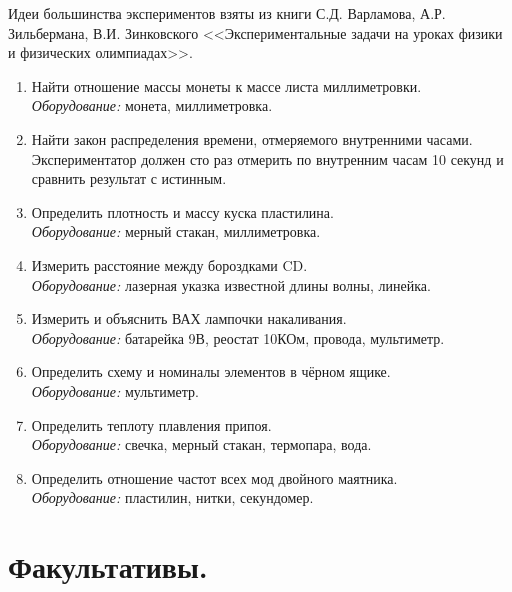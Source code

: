 \documentclass[11pt]{article}
\newlength{\h}
\newlength{\x}
\begin{document}
Идеи большинства экспериментов взяты из книги С.Д. Варламова,
А.Р. Зильбермана, В.И. Зинковского <<Экспериментальные задачи на
уроках физики и физических олимпиадах>>.

\begin{enumerate}
\item Найти отношение массы монеты к массе листа миллиметровки.\\
  \textit{Оборудование:} монета, миллиметровка.
\item Найти закон распределения времени, отмеряемого внутренними
  часами. Экспериментатор должен сто раз отмерить по внутренним часам
  10 секунд и сравнить результат с истинным.
\item Определить плотность и массу куска пластилина.\\
  \textit{Оборудование:} мерный стакан, миллиметровка.
\item Измерить расстояние между бороздками CD.\\
  \textit{Оборудование:} лазерная указка известной длины волны,
  линейка.
\item Измерить и объяснить ВАХ лампочки накаливания.\\
  \textit{Оборудование:} батарейка 9В, реостат 10КОм, провода, мультиметр. 
\item Определить схему и номиналы элементов в чёрном ящике.\\
  \textit{Оборудование:} мультиметр. 
\item Определить теплоту плавления припоя.\\
  \textit{Оборудование:} свечка, мерный стакан, термопара, вода. 
\item Определить отношение частот всех мод двойного
  маятника.\\
  \textit{Оборудование:} пластилин, нитки, секундомер.
\end{enumerate}

\section{Факультативы.}
\label{sec:spec}
\end{document}
